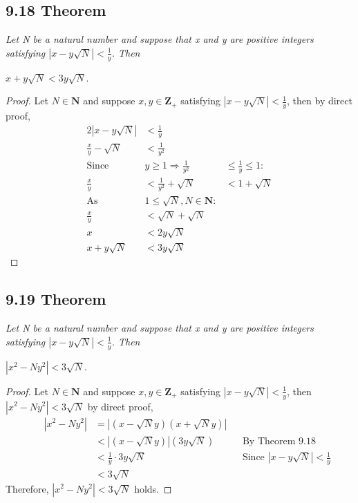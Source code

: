 \documentclass{article}
\begin{document}
\subsection*{9.18 Theorem} 
\quad \textit{Let N be a natural number and suppose that x and y are positive integers satisfying $|x-y\sqrt{N}| < \frac{1}{y}$. Then}
\begin{center}
    $x + y\sqrt{N} < 3y\sqrt{N}$.
\end{center}

\begin{proof}
Let $N \in \mathbf{N}$ and suppose $x,y \in \mathbf{Z_+}$ satisfying $|x-y\sqrt{N}| < \frac{1}{y}$, then by direct proof,
\begin{alignat*}{2}
    |x-y\sqrt{N}| &< \frac{1}{y} \;& \\
    \frac{x}{y}-\sqrt{N} &< \frac{1}{y^2} \;&\\
    \text{Since } &y \geq 1 \Longrightarrow \frac{1}{y^2} &\leq \frac{1}{y} \leq 1:\\
    \frac{x}{y} &< \frac{1}{y^2} + \sqrt{N}\;& < 1 + \sqrt{N}\\
    \text{As } &1 \leq \sqrt{N}, N \in \mathbf{N}: \\
    \frac{x}{y} &< \sqrt{N} + \sqrt{N}\;&\\
    x &< 2y\sqrt{N}\;&\\
    x + y\sqrt{N} &< 3y\sqrt{N}\;&
\end{alignat*}
\end{proof}

\subsection*{9.19 Theorem} 
\quad \textit{Let N be a natural number and suppose that x and y are positive integers satisfying $|x-y\sqrt{N}| < \frac{1}{y}$. Then}
\begin{center}
    $|x^2 - Ny^2| < 3\sqrt{N}$.
\end{center}

\begin{proof}
Let $N \in \mathbf{N}$ and suppose $x,y \in \mathbf{Z_+}$ satisfying $|x-y\sqrt{N}| < \frac{1}{y}$, then $|x^2 - Ny^2| < 3\sqrt{N}$ by direct proof,
\begin{align*}
    && |x^2 - Ny^2| &= |(x - \sqrt{N} y)(x + \sqrt{N} y)| &&\\
    &&              &< |(x - \sqrt{N} y)|(3y\sqrt{N}) && \text{By Theorem 9.18}\\
    &&              &< \frac{1}{y} \cdot 3y\sqrt{N} && \text{Since $|x-y\sqrt{N}| < \frac{1}{y}$}\\
    &&              &< 3\sqrt{N} &&
\end{align*}
Therefore, $|x^2 - Ny^2| < 3\sqrt{N}$ holds.
\end{proof}
\end{document}

